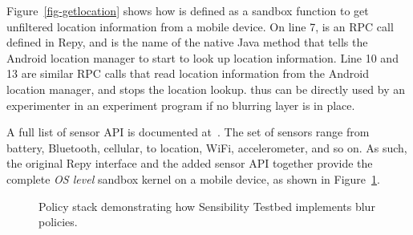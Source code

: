 Figure~\ref{fig-getlocation} shows how  
is defined as a sandbox function to get unfiltered location 
information from a mobile device. 
On line 7,  is an RPC call 
defined in Repy, 
and  is the name of the native Java method that tells the Android 
location manager to start to look up location information. Line 10 and 13 are similar RPC 
calls that read location information from the Android location manager, and stops the location 
lookup.  thus %
can be directly used by an experimenter in an experiment program if no blurring layer is in place.

A full list of sensor API is documented at~\cite{sensor-api}. The set
of sensors range from battery, Bluetooth, cellular, to location, WiFi, 
accelerometer, and so on. 
As such, the original Repy interface and the added sensor API together 
provide the complete \textit{OS level} sandbox kernel on a mobile 
device, as shown in Figure~\ref{fig-blur}.

\begin{figure}
\caption{\small Policy stack demonstrating how Sensibility Testbed implements blur policies. 
\label{fig-blur}}
\end{figure}

